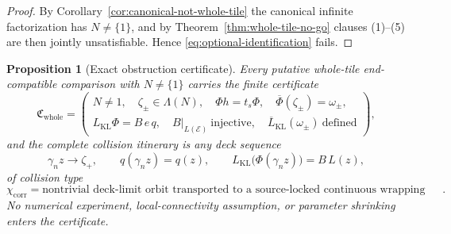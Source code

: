 \documentclass[11pt,reqno]{amsart}
\newtheorem{proposition}[theorem]{Proposition}
\theoremstyle{definition}
\theoremstyle{remark}
\begin{document}
\begin{proof}
By Corollary~\ref{cor:canonical-not-whole-tile} the canonical infinite factorization has \(N\ne\{1\}\), and by Theorem~\ref{thm:whole-tile-no-go} clauses (1)--(5) are then jointly unsatisfiable.  Hence \eqref{eq:optional-identification} fails.
\end{proof}
\begin{proposition}[Exact obstruction certificate]\label{prop:obstruction-certificate}
Every putative whole-tile end-compatible comparison with \(N\ne\{1\}\) carries the finite certificate
\begin{equation}\label{eq:certificate}
\mathfrak C_{\mathrm{whole}}
=
\left(
\begin{array}{l}
N\ne1,\quad \zeta_\pm\in\Lambda(N),\quad \Phi h=t_s\Phi,\quad \overline\Phi(\zeta_\pm)=\omega_\pm,\\[2pt]
L_{\mathrm{KL}}\Phi=B\,e\,q,\quad B|_{L(\mathcal E)}\ \text{injective},\quad \overline L_{\mathrm{KL}}(\omega_\pm)\ \text{defined}
\end{array}
\right),
\end{equation}
and the complete collision itinerary is any deck sequence
\begin{equation}\label{eq:itinerary}
\gamma_nz\longrightarrow\zeta_+,
\qquad
q(\gamma_nz)=q(z),
\qquad
L_{\mathrm{KL}}\bigl(\Phi(\gamma_nz)\bigr)=B\,L(z),
\end{equation}
of collision type
\begin{equation}\label{eq:collision-type}
\chi_{\mathrm{corr}}=\text{nontrivial deck-limit orbit transported to a source-locked continuous wrapping end}.
\end{equation}
No numerical experiment, local-connectivity assumption, or parameter shrinking enters the certificate.
\end{proposition}
\end{document}
